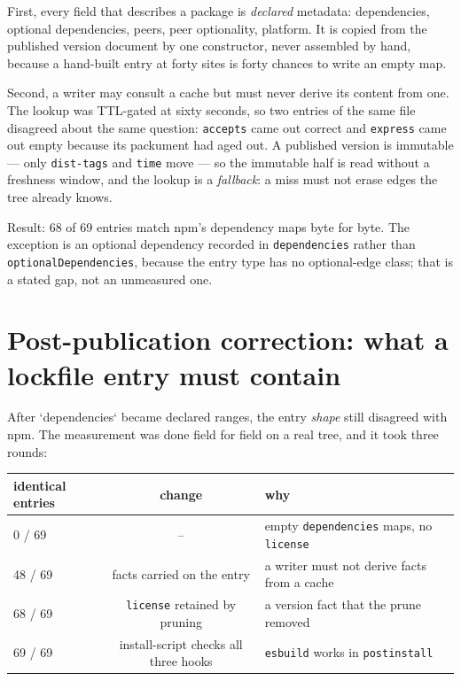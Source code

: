 \documentclass[
  11pt,
  letterpaper,
]{article}
\begin{document}
First, every field that describes a package is \emph{declared} metadata: dependencies, optional
dependencies, peers, peer optionality, platform. It is copied from the published version document
by one constructor, never assembled by hand, because a hand-built entry at forty sites is forty
chances to write an empty map.

Second, a writer may consult a cache but must never derive its content from one. The lookup was
TTL-gated at sixty seconds, so two entries of the same file disagreed about the same question:
\texttt{accepts} came out correct and \texttt{express} came out empty because its packument had
aged out. A published version is immutable --- only \texttt{dist-tags} and \texttt{time} move ---
so the immutable half is read without a freshness window, and the lookup is a \emph{fallback}:
a miss must not erase edges the tree already knows.

Result: 68 of 69 entries match npm's dependency maps byte for byte. The exception is an optional
dependency recorded in \texttt{dependencies} rather than \texttt{optionalDependencies}, because
the entry type has no optional-edge class; that is a stated gap, not an unmeasured one.


\section{Post-publication correction: what a lockfile entry must contain}

After `dependencies` became declared ranges, the entry \emph{shape} still disagreed with npm. The
measurement was done field for field on a real tree, and it took three rounds:

\begin{center}
\begin{tabular}{lcl}
identical entries & change & why \\
\hline
0 / 69 & -- & empty \texttt{dependencies} maps, no \texttt{license} \\
48 / 69 & facts carried on the entry & a writer must not derive facts from a cache \\
68 / 69 & \texttt{license} retained by pruning & a version fact that the prune removed \\
69 / 69 & install-script checks all three hooks & \texttt{esbuild} works in \texttt{postinstall} \\
\end{tabular}
\end{center}
\end{document}
